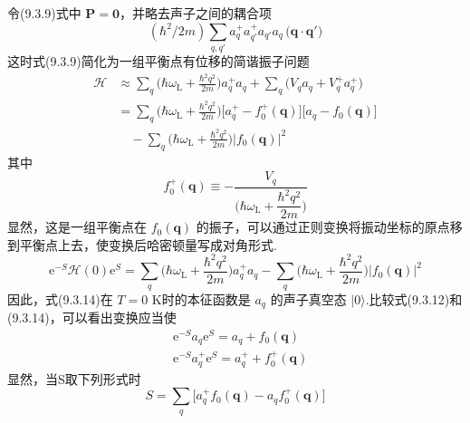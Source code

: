 令(9.3.9)式中 $\boldsymbol{P}=\boldsymbol{0}$，并略去声子之间的耦合项
\begin{equation}
  \left(\hbar^{2}/2m\right)\sum_{q,q'}
  a_{q}^{+}a_{q'}^{+}a_{q'}a_{q}\,
  \bigl(\boldsymbol{q}\cdot\boldsymbol{q}'\bigr)
\end{equation}
这时式(9.3.9)简化为一组平衡点有位移的简谐振子问题
\begin{equation}
\begin{aligned}
  \mathscr{H}&\approx\sum_{q}\biggl(\hbar\omega_{\mathrm L}
  +\frac{\hbar^{2}q^{2}}{2m}\biggr)a_{q}^{+}a_{q}
  +\sum_{q}\bigl(V_{q}a_{q}+V_{q}^{+}a_{q}^{+}\bigr)\\
  &=\sum_{q}\biggl(\hbar\omega_{\mathrm L}
  +\frac{\hbar^{2}q^{2}}{2m}\biggr)
  \bigl[a_{q}^{+}-f_{0}^{+}(\boldsymbol{q})\bigr]
  \bigl[a_{q}-f_{0}(\boldsymbol{q})\bigr]\\
  &\quad-\sum_{q}\biggl(\hbar\omega_{\mathrm L}
  +\frac{\hbar^{2}q^{2}}{2m}\biggr)
  \bigl|f_{0}(\boldsymbol{q})\bigr|^{2}
\end{aligned}
\end{equation}
其中
\begin{equation}
  f_{0}^{+}(\boldsymbol{q})\equiv-\frac{V_{q}}{\biggl(\hbar\omega_{\mathrm L}
  +\dfrac{\hbar^{2}q^{2}}{2m}\biggr)}
\end{equation}
显然，这是一组平衡点在 $f_{0}(\boldsymbol{q})$ 的振子，可以通过正则变换将振动坐标的原点移到平衡点上去，使变换后哈密顿量写成对角形式.
\begin{equation}
  \mathrm{e}^{-S}\mathscr{H}(0)\mathrm{e}^{S}
  =\sum_{q}\biggl(\hbar\omega_{\mathrm L}
  +\frac{\hbar^{2}q^{2}}{2m}\biggr)a_{q}^{+}a_{q}
  -\sum_{q}\biggl(\hbar\omega_{\mathrm L}
  +\frac{\hbar^{2}q^{2}}{2m}\biggr)
  \bigl|f_{0}(\boldsymbol{q})\bigr|^{2}
\end{equation}
因此，式(9.3.14)在 $T=0$ K时的本征函数是 $a_{q}$ 的声子真空态 $|0\rangle$.比较式(9.3.12)和(9.3.14)，可以看出变换应当使
\begin{equation}
\begin{aligned}
  &\mathrm{e}^{-S}a_{q}\mathrm{e}^{S}=a_{q}+f_{0}(\boldsymbol{q})\\
  &\mathrm{e}^{-S}a_{q}^{+}\mathrm{e}^{S}=a_{q}^{+}+f_{0}^{+}(\boldsymbol{q})
\end{aligned}
\end{equation}
显然，当S取下列形式时
\begin{equation}
  S=\sum_{q}\bigl[a_{q}^{+}f_{0}(\boldsymbol{q})
  -a_{q}f_{0}^{+}(\boldsymbol{q})\bigr]
\end{equation}
